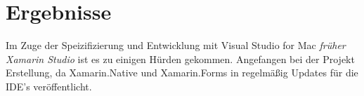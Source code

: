 %
%
% 
% 


\chapter{Ergebnisse}
\label{chap:xamarinformsresults}

Im Zuge der Speizifizierung und Entwicklung mit Visual Studio for Mac \textit{früher Xamarin Studio} ist es zu einigen Hürden gekommen. Angefangen bei der Projekt Erstellung, da Xamarin.Native und Xamarin.Forms in regelmäßig Updates für die IDE's veröffentlicht.
